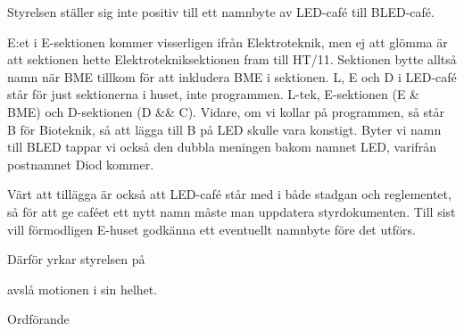\documentclass[../_main/handlingar.tex]{subfiles}
\begin{document}
\motionssvar

Styrelsen ställer sig inte positiv till ett namnbyte av LED-café till BLED-café.

E:et i E-sektionen kommer visserligen ifrån Elektroteknik, men ej att glömma är att sektionen hette Elektrotekniksektionen fram till HT/11. Sektionen bytte alltså namn när BME tillkom för att inkludera BME i sektionen. L, E och D i LED-café står för just sektionerna i huset, inte programmen. L-tek, E-sektionen (E \& BME) och D-sektionen (D \&\& C). Vidare, om vi kollar på programmen, så står B för Bioteknik, så att lägga till B på LED skulle vara konstigt. Byter vi namn till BLED tappar vi också den dubbla meningen bakom namnet LED, varifrån postnamnet Diod kommer.

Värt att tillägga är också att LED-café står med i både stadgan och reglementet, så för att ge caféet ett nytt namn måste man uppdatera styrdokumenten. Till sist vill förmodligen E-huset godkänna ett eventuellt namnbyte före det utförs.

Därför yrkar styrelsen på
\begin{attsatser}
    \att avslå motionen i sin helhet.
\end{attsatser}

\begin{signatures}{1}
    \ist
    \signature{Erik Månsson}{Ordförande}
\end{signatures}
\end{document}
